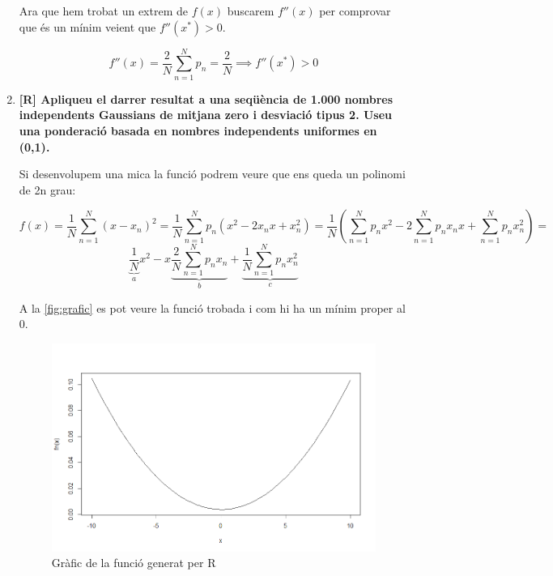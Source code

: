 \documentclass[a4paper]{article}
\begin{document}
\begin{enumerate}
Ara que hem trobat un extrem de $f(x)$ buscarem $f''(x)$ per comprovar que és un mínim veient que $f''(x^*) > 0$.

$$
f''(x) = \frac{2}{N}\sum_{n=1}^N p_n = \frac{2}{N} \implies f''(x^*) > 0
$$

\item \textbf{[R] Apliqueu el darrer resultat a una seqüència de 1.000 nombres independents Gaussians de mitjana zero i desviació tipus 2. Useu una ponderació basada en nombres independents uniformes en (0,1).}

Si desenvolupem una mica la funció podrem veure que ens queda un polinomi de 2n grau:

$$
f(x) = \frac{1}{N} \sum_{n=1}^N (x - x_n)^2 =
\frac{1}{N} \sum_{n=1}^N p_n \left( x^2 - 2x_n x + x_n^2 \right) =
\frac{1}{N} \left( \sum_{n=1}^N p_n x^2 - 2\sum_{n=1}^N p_n x_n x + \sum_{n=1}^N p_n x_n^2 \right)=
$$
$$
\underbrace{\frac{1}{N}}_a x^2 - x \underbrace{\frac{2}{N}\sum_{n=1}^N p_n x_n}_b + \underbrace{\frac{1}{N}\sum_{n=1}^N p_n x_n^2}_c
$$

A la \autoref{fig:grafic} es pot veure la funció trobada i com hi ha un mínim proper al 0.

\vspace{0.5cm}



\begin{figure}[H]
    \centering
    \includegraphics[width=0.5\linewidth]{problema_1_plot}
    \caption{Gràfic de la funció generat per R}
    \label{fig:grafic}
\end{figure}

\end{enumerate}
\end{document}
